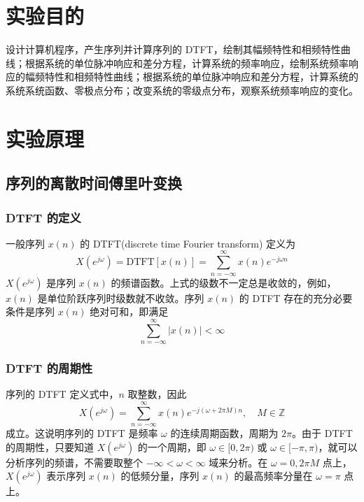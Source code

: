 \documentclass[12pt,AutoFakeBold]{article}
\begin{document}
\maketitle
\setcounter{tocdepth}{2}
\tableofcontents  %

\makeatletter
\begin{center}
    \LARGE \textbf{\textsf{\@problem}}
\end{center}
\makeatother

\section{实验目的}

设计计算机程序，产生序列并计算序列的 DTFT，绘制其幅频特性和相频特性曲线；根据系统的单位脉冲响应和差分方程，计算系统的频率响应，绘制系统频率响应的幅频特性和相频特性曲线；根据系统的单位脉冲响应和差分方程，计算系统的系统系统函数、零极点分布；改变系统的零级点分布，观察系统频率响应的变化。

\section{实验原理}

\subsection{序列的离散时间傅里叶变换}

\subsubsection{DTFT 的定义}

一般序列 $x(n)$ 的 DTFT(discrete time Fourier transform) 定义为
%
\begin{equation*}
X(e^{j\omega})=\mathrm{DTFT}[x(n)]=\sum_{n=-\infty}^\infty x(n)e^{-j\omega n}
\end{equation*}
%
$X(e^{j\omega})$ 是序列 $x(n)$ 的频谱函数。上式的级数不一定总是收敛的，例如，$x(n)$ 是单位阶跃序列时级数就不收敛。序列 $x(n)$ 的 DTFT 存在的充分必要条件是序列 $x(n)$ 绝对可和，即满足
\begin{equation*}
\sum_{n=-\infty}^\infty|x(n)|<\infty
\end{equation*}

\subsubsection{DTFT 的周期性}

序列的 DTFT 定义式中，$n$ 取整数，因此
%
\begin{equation*}
X(e^{j\omega})=\sum_{n=-\infty}^\infty x(n)e^{-j(\omega+2\pi M)n},\quad M\in\mathbb{Z}
\end{equation*}
%
成立。这说明序列的 DTFT 是频率 $\omega$ 的连续周期函数，周期为 $2\pi$。由于 DTFT 的周期性，只要知道 $X(e^{j\omega})$ 的一个周期，即 $\omega\in[0,2\pi)$ 或 $\omega\in[-\pi,\pi)$，就可以分析序列的频谱，不需要取整个 $-\infty<\omega<\infty$ 域来分析。在 $\omega=0,2\pi M$ 点上，$X(e^{j\omega})$ 表示序列 $x(n)$ 的低频分量，序列 $x(n)$ 的最高频率分量在 $\omega=\pi$ 点上。
\end{document}
